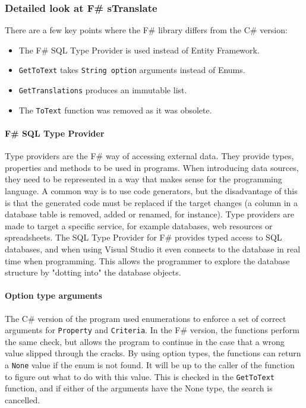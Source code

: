 \documentclass[12pt, a4paper]{article}
\newcommand{\code}[1]{{\small \texttt{#1}}}
\begin{document}
\newpage


\subsubsection{Detailed look at F\# sTranslate}
There are a few key points where the F\# library differs from the C\# version:
\begin{itemize}
	\item The F\# SQL Type Provider is used instead of Entity Framework.
	\item \code{GetToText} takes \code{String option} arguments instead of Enums.
	\item \code{GetTranslations} produces an immutable list.
	\item The \code{ToText} function was removed as it was obsolete.
\end{itemize}

\paragraph{F\# SQL Type Provider} Type providers are the F\# way of accessing external data. They provide types, properties and methods to be used in programs. When introducing data sources, they need to be represented in a way that makes sense for the programming language. A common way is to use code generators, but the disadvantage of this is that the generated code must be replaced if the target changes (a column in a database table is removed, added or renamed, for instance). Type providers are made to target a specific service, for example databases, web resources or spreadsheets. The SQL Type Provider for F\# provides typed access to SQL databases, and when using Visual Studio it even connects to the database in real time when programming. This allows the programmer to explore the database structure by "dotting into" the database objects.

\paragraph{Option type arguments} The C\# version of the program used enumerations to enforce a set of correct arguments for \code{Property} and \code{Criteria}. In the F\# version, the functions perform the same check, but allows the program to continue in the case that a wrong value slipped through the cracks. By using option types, the functions can return a \code{None} value if the enum is not found. It will be up to the caller of the function to figure out what to do with this value. This is checked in the \code{GetToText} function, and if either of the arguments have the None type, the search is cancelled.
\end{document}
